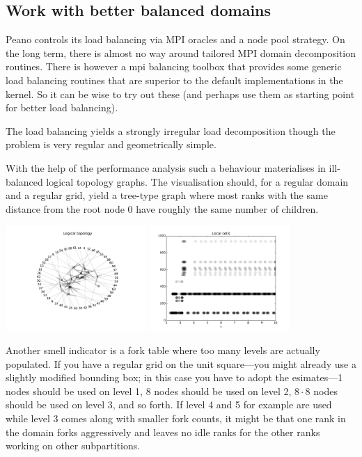 \subsection{Work with better balanced domains}

\noindent
Peano controls its load balancing via MPI oracles and a node pool strategy. 
On the long term, there is almost no way around tailored MPI domain
decomposition routines.
There is however a mpi balancing toolbox that provides some generic load
balancing routines that are superior to the default implementations in the
kernel.
So it can be wise to try out these (and perhaps use them as starting point for
better load balancing).

\begin{smell}
  The load balancing yields a strongly irregular load decomposition though the
  problem is very regular and geometrically simple.
\end{smell}

\noindent
With the help of the performance analysis such a behaviour materialises in
ill-balanced logical topology graphs.
The visualisation should, for a regular domain and a regular grid, yield a
tree-type graph where most ranks with the same distance from the root node 0
have roughly the same number of children.

\begin{center} 
  \includegraphics[width=0.4\textwidth]{62_quick-tuning/topology.pdf}
  \includegraphics[width=0.4\textwidth]{62_quick-tuning/local-cells.pdf}
\end{center}

\noindent
Another smell indicator is a fork table where too many levels are actually
populated. 
If you have a regular grid on the unit square---you might already use a slightly
modified bounding box; in this case you have to adopt the esimates---1 nodes
should be used on level 1, 8 nodes should be used on level 2, $8 \cdot 8$ nodes
should be used on level 3, and so forth.
If level 4 and 5 for example are used while level 3 comes along with smaller
fork counts, it might be that one rank in the domain forks aggressively and
leaves no idle ranks for the other ranks working on other subpartitions.

